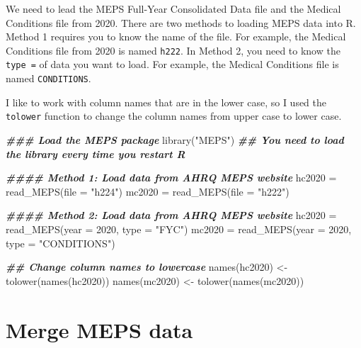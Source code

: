 \documentclass[
]{book}
\newenvironment{Shaded}{\begin{snugshade}}{\end{snugshade}}
\newcommand{\AttributeTok}[1]{\textcolor[rgb]{0.77,0.63,0.00}{#1}}
\newcommand{\DecValTok}[1]{\textcolor[rgb]{0.00,0.00,0.81}{#1}}
\newcommand{\DocumentationTok}[1]{\textcolor[rgb]{0.56,0.35,0.01}{\textbf{\textit{#1}}}}
\newcommand{\FunctionTok}[1]{\textcolor[rgb]{0.00,0.00,0.00}{#1}}
\newcommand{\NormalTok}[1]{#1}
\newcommand{\OtherTok}[1]{\textcolor[rgb]{0.56,0.35,0.01}{#1}}
\newcommand{\StringTok}[1]{\textcolor[rgb]{0.31,0.60,0.02}{#1}}
\begin{document}
We need to lead the MEPS Full-Year Consolidated Data file and the Medical Conditions file from 2020. There are two methods to loading MEPS data into R. Method 1 requires you to know the name of the file. For example, the Medical Conditions file from 2020 is named \texttt{h222}. In Method 2, you need to know the \texttt{type\ =} of data you want to load. For example, the Medical Conditions file is named \texttt{CONDITIONS}.

I like to work with column names that are in the lower case, so I used the \texttt{tolower} function to change the column names from upper case to lower case.

\begin{Shaded}
\begin{Highlighting}[]
\DocumentationTok{\#\#\# Load the MEPS package}
\FunctionTok{library}\NormalTok{(}\StringTok{"MEPS"}\NormalTok{) }\DocumentationTok{\#\# You need to load the library every time you restart R}

\DocumentationTok{\#\#\#\# Method 1: Load data from AHRQ MEPS website}
\NormalTok{hc2020 }\OtherTok{=} \FunctionTok{read\_MEPS}\NormalTok{(}\AttributeTok{file =} \StringTok{"h224"}\NormalTok{)}
\NormalTok{mc2020 }\OtherTok{=} \FunctionTok{read\_MEPS}\NormalTok{(}\AttributeTok{file =} \StringTok{"h222"}\NormalTok{)}

\DocumentationTok{\#\#\#\# Method 2: Load data from AHRQ MEPS website}
\NormalTok{hc2020 }\OtherTok{=} \FunctionTok{read\_MEPS}\NormalTok{(}\AttributeTok{year =} \DecValTok{2020}\NormalTok{, }\AttributeTok{type =} \StringTok{"FYC"}\NormalTok{)}
\NormalTok{mc2020 }\OtherTok{=} \FunctionTok{read\_MEPS}\NormalTok{(}\AttributeTok{year =} \DecValTok{2020}\NormalTok{, }\AttributeTok{type =} \StringTok{"CONDITIONS"}\NormalTok{)}

\DocumentationTok{\#\# Change column names to lowercase}
\FunctionTok{names}\NormalTok{(hc2020) }\OtherTok{\textless{}{-}} \FunctionTok{tolower}\NormalTok{(}\FunctionTok{names}\NormalTok{(hc2020))}
\FunctionTok{names}\NormalTok{(mc2020) }\OtherTok{\textless{}{-}} \FunctionTok{tolower}\NormalTok{(}\FunctionTok{names}\NormalTok{(mc2020))}
\end{Highlighting}
\end{Shaded}

\hypertarget{merge-meps-data}{%
\section{Merge MEPS data}\label{merge-meps-data}}
\end{document}
